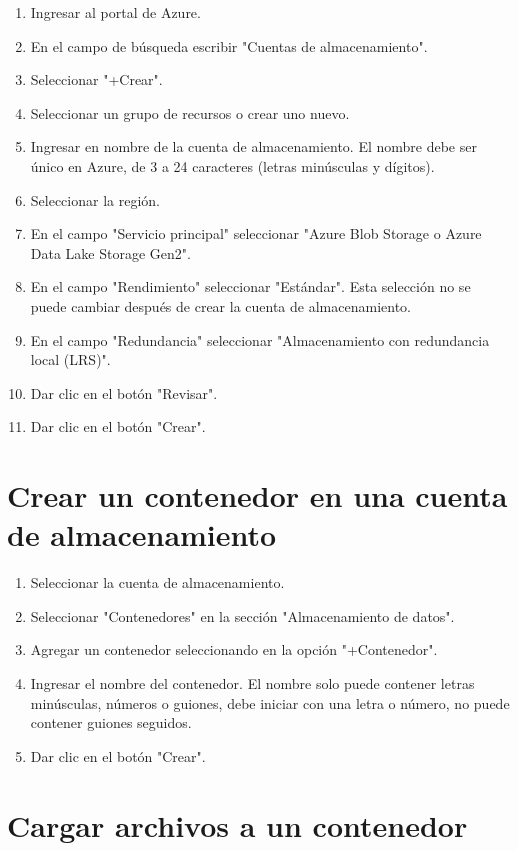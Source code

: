 \begin{enumerate}
\item Ingresar al portal de Azure.
\item En el campo de búsqueda escribir "Cuentas de almacenamiento".
\item Seleccionar "+Crear".
\item Seleccionar un grupo de recursos o crear uno nuevo.
\item Ingresar en nombre de la cuenta de almacenamiento. El nombre debe ser único en Azure, de 3 a 24 caracteres (letras minúsculas y dígitos).
\item Seleccionar la región.
\item En el campo "Servicio principal" seleccionar "Azure Blob Storage o Azure Data Lake Storage Gen2".
\item En el campo "Rendimiento" seleccionar "Estándar". Esta selección no se puede cambiar después de crear la cuenta de almacenamiento.
\item En el campo "Redundancia" seleccionar "Almacenamiento con redundancia local (LRS)".
\item Dar clic en el botón "Revisar".
\item Dar clic en el botón "Crear".
\end{enumerate}

\section{Crear un contenedor en una cuenta de almacenamiento}

\begin{enumerate}
\item Seleccionar la cuenta de almacenamiento.
\item Seleccionar "Contenedores" en la sección "Almacenamiento de datos".
\item Agregar un contenedor seleccionando en la opción "+Contenedor".
\item Ingresar el nombre del contenedor. El nombre solo puede contener letras minúsculas, números o guiones, debe iniciar con una letra o número, no puede contener guiones seguidos.
\item Dar clic en el botón "Crear".
\end{enumerate}

\section{Cargar archivos a un contenedor}

